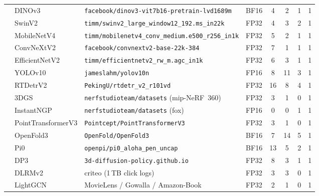 \begin{table}[H]
\begin{tabular}{@{}ll>{\raggedright\arraybackslash}p{4.5cm}lcccc@{}}
   & DINOv3             & \texttt{facebook/\allowbreak dinov3-vit7b16-pretrain-lvd1689m} & BF16 & 4  & 2  & 1 & 1 \\
   & SwinV2             & \texttt{timm/\allowbreak swinv2\_large\_window12\_192.ms\_in22k} & FP32 & 4 & 3 & 2 & 1 \\
  \midrule
   & MobileNetV4        & \texttt{timm/\allowbreak mobilenetv4\_conv\_medium.\allowbreak e500\_r256\_in1k} & FP32 & 5  & 2  & 1 & 1 \\
   & ConvNeXtV2         & \texttt{facebook/\allowbreak convnextv2-base-22k-384}    & FP32 & 7  & 1  & 1 & 1 \\
   & EfficientNetV2     & \texttt{timm/\allowbreak efficientnetv2\_rw\_m.agc\_in1k} & FP32 & 6  & 3  & 1 & 1 \\
   & YOLOv10            & \texttt{jameslahm/\allowbreak yolov10n}                  & FP16 & 8  & 11 & 3 & 1 \\
   & RTDetrV2           & \texttt{PekingU/\allowbreak rtdetr\_v2\_r101vd}          & FP32 & 16 & 8  & 4 & 1 \\
  \midrule
   & 3DGS               & \texttt{nerfstudioteam/\allowbreak datasets} (mip-NeRF~360) & FP32 & 3  & 1  & 0 & 1 \\
   & InstantNGP         & \texttt{nerfstudioteam/\allowbreak datasets} (fox)       & FP16 & 0  & 0  & 1 & 1 \\
   & PointTransformerV3 & \texttt{Pointcept/\allowbreak PointTransformerV3}        & FP32 & 3  & 1  & 0 & 1 \\
   & OpenFold3          & \texttt{OpenFold/\allowbreak OpenFold3}                  & BF16 & 7  & 14 & 5 & 1 \\
   & Pi0                & \texttt{openpi/\allowbreak pi0\_aloha\_pen\_uncap}       & BF16 & 13 & 5  & 2 & 1 \\
   & DP3                & \texttt{3d-diffusion-policy.\allowbreak github.io}       & FP32 & 8  & 3  & 1 & 1 \\
  \midrule
   & DLRMv2             & criteo (1\,TB click logs)                                 & FP32 & 3  & 3  & 0 & 1 \\
   & LightGCN           & MovieLens / Gowalla / Amazon-Book                         & FP32 & 2  & 1  & 0 & 1 \\

\end{tabular}
\end{table}
